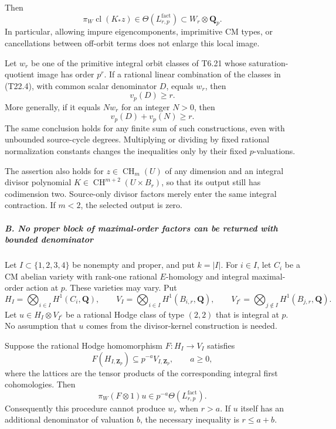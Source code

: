 \documentclass[11pt,a4paper]{article}
\theoremstyle{definition}
\begin{document}
Then \[
 \pi_W\operatorname{cl}(K_*z)
       \in\Theta(L^{\mathrm{fact}}_{r,p})
       \subset W_r\otimes\mathbf Q_p.
 \tag{T22.4}
\] In particular, allowing impure eigencomponents, imprimitive CM types, or cancellations between off-orbit terms does not enlarge this local image.

Let \(w_r\) be one of the primitive integral orbit classes of T6.21 whose saturation-quotient image has order \(p^r\). If a rational linear combination of the classes in (T22.4), with common scalar denominator \(D\), equals \(w_r\), then \[
 v_p(D)\ge r.
 \tag{T22.5}
\] More generally, if it equals \(Nw_r\) for an integer \(N>0\), then \[
 v_p(D)+v_p(N)\ge r.
 \tag{T22.6}
\] The same conclusion holds for any finite sum of such constructions, even with unbounded source-cycle degrees. Multiplying or dividing by fixed rational normalization constants changes the inequalities only by their fixed \(p\)-valuations.

The assertion also holds for \(z\in\operatorname{CH}_m(U)\) of any dimension and an integral divisor polynomial \(K\in\operatorname{CH}^{m+2}(U\times B_r)\), so that its output still has codimension two. Source-only divisor factors merely enter the same integral contraction. If \(m<2\), the selected output is zero.

\subparagraph{B. No proper block of maximal-order factors can be returned with bounded denominator}\label{b.-no-proper-block-of-maximal-order-factors-can-be-returned-with-bounded-denominator}

Let \(I\subset\{1,2,3,4\}\) be nonempty and proper, and put \(k=|I|\). For \(i\in I\), let \(C_i\) be a CM abelian variety with rank-one rational \(E\)-homology and integral maximal-order action at \(p\). These varieties may vary. Put \[
 H_I=\bigotimes_{i\in I}H^1(C_i,\mathbf Q),\qquad
 V_I=\bigotimes_{i\in I}H^1(B_{i,r},\mathbf Q),\qquad
 V_{I^c}=\bigotimes_{j\notin I}H^1(B_{j,r},\mathbf Q).
 \tag{T22.7}
\] Let \(u\in H_I\otimes V_{I^c}\) be a rational Hodge class of type \((2,2)\) that is integral at \(p\). No assumption that \(u\) comes from the divisor-kernel construction is needed.

Suppose the rational Hodge homomorphism \(F:H_I\to V_I\) satisfies \[
 F(H_{I,\mathbf Z_p})\subseteq p^{-a}V_{I,\mathbf Z_p},
 \qquad a\ge0,
 \tag{T22.8}
\] where the lattices are the tensor products of the corresponding integral first cohomologies. Then \[
 \pi_W(F\otimes1)u
       \in p^{-a}\Theta(L^{\mathrm{fact}}_{r,p}).
 \tag{T22.9}
\] Consequently this procedure cannot produce \(w_r\) when \(r>a\). If \(u\) itself has an additional denominator of valuation \(b\), the necessary inequality is \(r\le a+b\).
\end{document}
